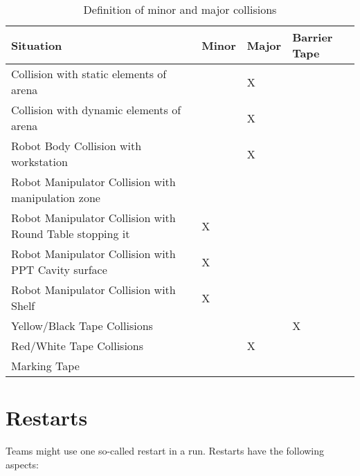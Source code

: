 \begin{table}[h!]
	\caption{Definition of minor and major collisions}
	\label{tab:collisions}
	\centering
  \begin{tabular}{|l|p{1cm}|p{1cm}|p{1.5cm}|}
		\hline
		Situation                                                & Minor & Major & Barrier Tape \\
    \hline
    Collision with static elements of arena                  &       & X     &              \\
    Collision with dynamic elements of arena                 &       & X     &              \\
    Robot Body Collision with workstation                    &       & X     &              \\
    Robot Manipulator Collision with manipulation zone       &       &       &              \\
    Robot Manipulator Collision with Round Table stopping it & X     &       &              \\
    Robot Manipulator Collision with PPT Cavity surface      & X     &       &              \\
    Robot Manipulator Collision with Shelf                   & X     &       &              \\
		Yellow/Black Tape Collisions                             &       &       & X            \\
    Red/White Tape Collisions                                &       & X     &              \\
    Marking Tape & & & \\
    \hline
	\end{tabular}
\end{table}

\section{Restarts}
Teams might use one so-called restart in a run. Restarts have the following aspects:

